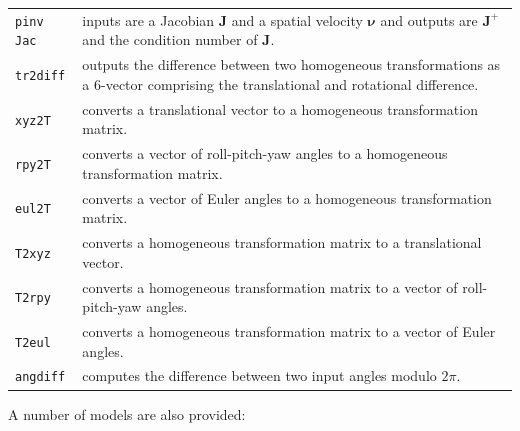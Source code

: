 \documentclass[a4paper,twoside]{report}
\begin{document}
\begin{longtable}{p{}p{}}
\texttt{pinv Jac} & inputs are a Jacobian $\mathbf{J}$ and a spatial velocity  $\mathbf{\nu}$ and outputs are $\mathbf{J}^{+}$  and the condition number of $\mathbf{J}$.\\

\texttt{tr2diff} & outputs the difference between two
homogeneous transformations as a 6-vector comprising the translational and
rotational difference.\\

\texttt{xyz2T} & converts a translational vector
to a homogeneous transformation matrix.\\

\texttt{rpy2T} & converts a vector of roll-pitch-yaw angles to
a homogeneous transformation matrix.\\

\texttt{eul2T} & converts a vector of Euler angles to
a homogeneous transformation matrix.\\

\texttt{T2xyz} & converts a homogeneous transformation matrix
to a translational vector.\\

\texttt{T2rpy} & converts a homogeneous transformation matrix
to a vector of roll-pitch-yaw angles.\\

\texttt{T2eul} & converts a homogeneous transformation matrix
to a vector of Euler angles.\\

\texttt{angdiff} & computes the difference between two input angles modulo $2\pi$.
\end{longtable}

A number of models are also provided:
\end{document}
